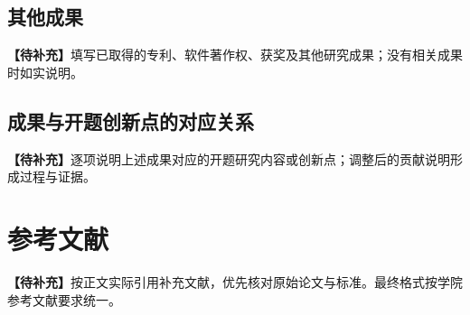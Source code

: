 \documentclass[UTF8,a4paper,12pt,fontset=fandol]{ctexart}
\newcommand{\pending}[1]{\par\noindent\textbf{【待补充】}#1\par}
\begin{document}
\subsection{其他成果}
\pending{填写已取得的专利、软件著作权、获奖及其他研究成果；没有相关成果时如实说明。}

\subsection{成果与开题创新点的对应关系}
\pending{逐项说明上述成果对应的开题研究内容或创新点；调整后的贡献说明形成过程与证据。}

\section{参考文献}
\pending{按正文实际引用补充文献，优先核对原始论文与标准。最终格式按学院参考文献要求统一。}

\end{document}
